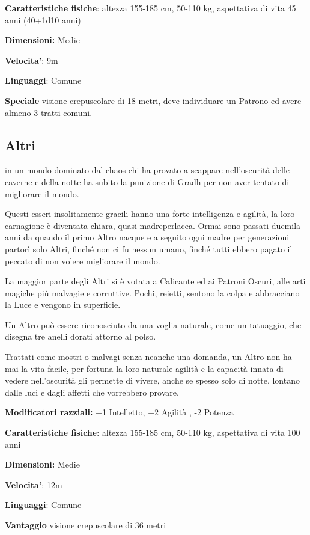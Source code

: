 \documentclass[a4paper,11pt,twoside,openany]{book}
\begin{document}
\textbf{Caratteristiche fisiche}: altezza 155-185 cm, 50-110 kg, aspettativa di vita 45 anni (40+1d10 anni)

\textbf{Dimensioni:} Medie

\textbf{Velocita'}: 9m

\textbf{Linguaggi}: Comune

\textbf{Speciale} visione crepuscolare di 18 metri, deve individuare un Patrono ed avere almeno 3 tratti comuni.

\subsection{Altri}

\label{altri}

in un mondo dominato dal chaos chi ha provato a scappare nell'oscurità delle caverne e della notte ha subito la punizione di Gradh per non aver tentato di migliorare il mondo.

Questi esseri insolitamente gracili hanno una forte intelligenza e agilità, la loro carnagione è diventata chiara, quasi madreperlacea. Ormai sono passati duemila anni da quando il primo Altro nacque e a seguito ogni madre per generazioni partorì solo Altri, finché non ci fu nessun umano, finché tutti ebbero pagato il peccato di non volere migliorare il mondo.

La maggior parte degli Altri si è votata a Calicante ed ai Patroni Oscuri, alle arti magiche più malvagie e corruttive. Pochi, reietti, sentono la colpa e abbracciano la Luce e vengono in superficie.

Un Altro può essere riconosciuto da una voglia naturale, come un tatuaggio, che disegna tre anelli dorati attorno al polso.

Trattati come mostri o malvagi senza neanche una domanda, un Altro non ha mai la vita facile, per fortuna la loro naturale agilità e la capacità innata di vedere nell'oscurità gli permette di vivere, anche se spesso solo di notte, lontano dalle luci e dagli affetti che vorrebbero provare.

\textbf{Modificatori razziali:} +1 Intelletto, +2 Agilità , -2 Potenza

\textbf{Caratteristiche fisiche}: altezza 155-185 cm, 50-110 kg, aspettativa
di vita 100 anni

\textbf{Dimensioni:} Medie

\textbf{Velocita'}: 12m

\textbf{Linguaggi}: Comune

\textbf{Vantaggio} visione crepuscolare di 36 metri
\end{document}
